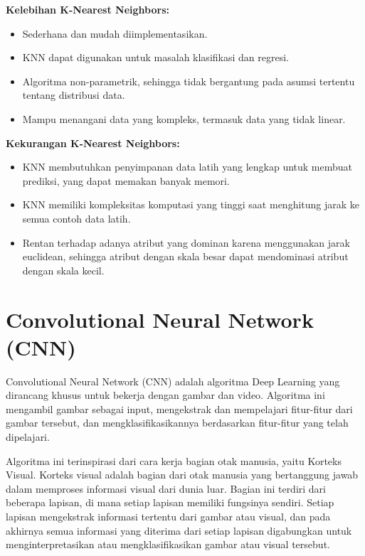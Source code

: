 \documentclass[
  letterpaper,
  DIV=11,
  numbers=noendperiod]{scrreprt}
\providecommand{\tightlist}{%
  \setlength{\itemsep}{0pt}\setlength{\parskip}{0pt}}\usepackage{longtable,booktabs,array}
\begin{document}
\textbf{Kelebihan K-Nearest Neighbors:}

\begin{itemize}
\tightlist
\item
  Sederhana dan mudah diimplementasikan.\\
\item
  KNN dapat digunakan untuk masalah klasifikasi dan regresi.\\
\item
  Algoritma non-parametrik, sehingga tidak bergantung pada asumsi
  tertentu tentang distribusi data.\\
\item
  Mampu menangani data yang kompleks, termasuk data yang tidak linear.
\end{itemize}

\textbf{Kekurangan K-Nearest Neighbors:}

\begin{itemize}
\tightlist
\item
  KNN membutuhkan penyimpanan data latih yang lengkap untuk membuat
  prediksi, yang dapat memakan banyak memori.\\
\item
  KNN memiliki kompleksitas komputasi yang tinggi saat menghitung jarak
  ke semua contoh data latih.\\
\item
  Rentan terhadap adanya atribut yang dominan karena menggunakan jarak
  euclidean, sehingga atribut dengan skala besar dapat mendominasi
  atribut dengan skala kecil.
\end{itemize}

\hypertarget{convolutional-neural-network-cnn}{%
\section*{Convolutional Neural Network
(CNN)}\label{convolutional-neural-network-cnn}}


Convolutional Neural Network (CNN) adalah algoritma Deep Learning yang
dirancang khusus untuk bekerja dengan gambar dan video. Algoritma ini
mengambil gambar sebagai input, mengekstrak dan mempelajari fitur-fitur
dari gambar tersebut, dan mengklasifikasikannya berdasarkan fitur-fitur
yang telah dipelajari.

Algoritma ini terinspirasi dari cara kerja bagian otak manusia, yaitu
Korteks Visual. Korteks visual adalah bagian dari otak manusia yang
bertanggung jawab dalam memproses informasi visual dari dunia luar.
Bagian ini terdiri dari beberapa lapisan, di mana setiap lapisan
memiliki fungsinya sendiri. Setiap lapisan mengekstrak informasi
tertentu dari gambar atau visual, dan pada akhirnya semua informasi yang
diterima dari setiap lapisan digabungkan untuk menginterpretasikan atau
mengklasifikasikan gambar atau visual tersebut.
\end{document}
